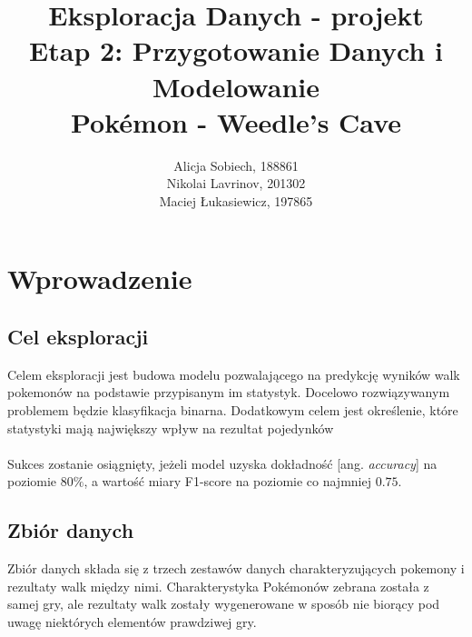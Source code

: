 \documentclass[12pt, a4paper]{report}
\begin{document}
\title{
  \Huge \textbf{Eksploracja Danych - projekt}
  \\ \vspace{5pt}
  \LARGE  Etap 2: Przygotowanie Danych i Modelowanie
  \\ \vspace{10pt}
  \Large  Pokémon - Weedle's Cave
}

\author{Alicja Sobiech, 188861\\
Nikolai Lavrinov, 201302\\
Maciej Łukasiewicz, 197865}


\maketitle


\tableofcontents

\renewcommand{\arraystretch}{1.2}


\newpage
{}

\section{Wprowadzenie}

\subsection{Cel eksploracji}

Celem eksploracji jest budowa modelu pozwalającego na predykcję wyników walk pokemonów na podstawie przypisanym im statystyk. Docelowo rozwiązywanym problemem będzie klasyfikacja binarna. Dodatkowym celem jest określenie, które statystyki mają największy wpływ na rezultat pojedynków\\\\
\noindent
Sukces zostanie osiągnięty, jeżeli model uzyska dokładność [ang. \textit{accuracy}] na poziomie \(80\%\), a wartość miary F1-score na poziomie co najmniej \(0.75\).

\subsection{Zbiór danych}
Zbiór danych składa się z trzech zestawów danych charakteryzujących pokemony i rezultaty walk między nimi. Charakterystyka Pokémonów zebrana została z samej gry, ale rezultaty walk zostały wygenerowane w sposób nie biorący pod uwagę niektórych elementów prawdziwej gry.
\end{document}
